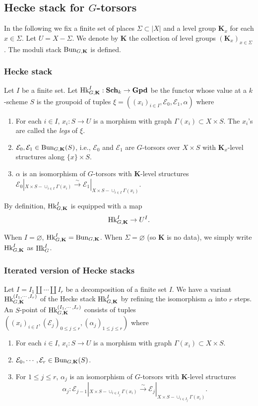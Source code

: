 \documentclass[11pt]{amsart}
\numberwithin{equation}{section}
\theoremstyle{plain}
\theoremstyle{definition}
\newcommand\cE{\mathcal{E}}
\def\bK{\mathbf{K}}
\newcommand{\Bun}{\textup{Bun}}
\newcommand{\Hk}{\textup{Hk}}
\newcommand{\isom}{\stackrel{\sim}{\to}}
\newcommand\sss{\subsubsection}
\newcommand{\vn}{\varnothing}
\renewcommand\a\alpha
\newcommand\G\Gamma
\newcommand{\Sig}{\Sigma}
\newcommand\Sch{\mathbf{Sch}}
\newcommand\Gpd{\mathbf{Gpd}}
\begin{document}
\subsection{Hecke stack for $G$-torsors}
In the following we fix a finite set of places $\Sigma\subset |X|$ and a level group $\bK_{x}$ for each $x\in \Sigma$.  Let $U=X-\Sigma$. We denote by $\bK$ the collection of level groups $(\bK_{x})_{x\in \Sigma}$. The moduli stack $\Bun_{G,\bK}$ is defined.


\sss{Hecke stack}\label{sss:Hk}

Let $I$ be a finite set. Let $\Hk^{I}_{G,\bK}: \Sch_{k}\to \Gpd$ be the functor whose value at a $k$-scheme $S$ is the groupoid of tuples $\xi=((x_{i})_{i\in I}, \cE_{0},\cE_{1} ,\a)$ where
\begin{enumerate}
\item For each $i\in I$, $x_{i}: S\to U$ is a morphism with graph $\G(x_{i})\subset X\times S$. The $x_{i}$'s are called the {\em legs} of $\xi$.
\item $\cE_{0},\cE_{1}\in \Bun_{G,\bK}(S)$, i.e.,  $\cE_{0}$ and $\cE_{1}$ are  $G$-torsors over $X\times S$ with $\bK_{x}$-level structures along $\{x\}\times S$.
\item $\a$ is an isomorphism of $G$-torsors with $\bK$-level structures $\cE_{0}|_{X\times S-\cup_{i\in I}\G(x_{i})}\isom \cE_{1}|_{X\times S-\cup_{i\in I}\G(x_{i})}$.
\end{enumerate}

By definition, $\Hk_{G,\bK}^{I}$ is equipped with a map 
\begin{equation*}
\Hk^{I}_{G,\bK}\to U^{I}.
\end{equation*}

When $I=\vn$, $\Hk^{I}_{G,\bK}=\Bun_{G,\bK}$. When $\Sig=\vn$ (so $\bK$ is no data), we simply write $\Hk^{I}_{G,\bK}$ as $\Hk^{I}_{G}$.




\sss{Iterated version of Hecke stacks}\label{sss:it Hk}
Let $I=I_{1}\coprod \cdots\coprod I_{r}$ be a decomposition of a finite set $I$. We have a variant $\Hk^{(I_{1},\cdots, I_{r})}_{G,\bK}$ of the Hecke stack $\Hk^{I}_{G,\bK}$ by refining the isomorphism $\a$ into $r$ steps. An $S$-point of $\Hk^{(I_{1},\cdots, I_{r})}_{G,\bK}$ consists of tuples $((x_{i})_{i\in I}, (\cE_{j})_{0\le j\le r} ,(\a_{j})_{1\le j\le r})$ where
\begin{enumerate}
\item For each $i\in I$, $x_{i}: S\to U$ is a morphism with graph $\G(x_{i})\subset X\times S$.
\item $\cE_{0},\cdots, \cE_{r}\in \Bun_{G,\bK}(S)$.
\item For $1\le j\le r$, $\a_{j}$ is an isomorphism of $G$-torsors with $\bK$-level structures 
$$\a_{j}: \cE_{j-1}|_{X\times S-\cup_{i\in I_{j}}\G(x_{i})}\isom \cE_{j}|_{X\times S-\cup_{i\in I_{j}}\G(x_{i})}.$$
\end{enumerate}
\end{document}
